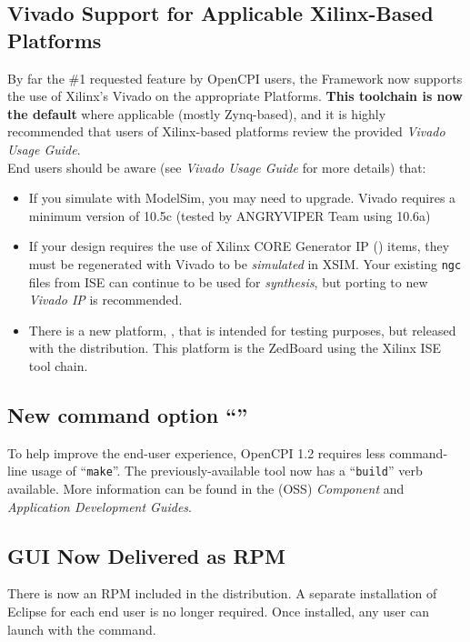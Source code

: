 \subsection{Vivado Support for Applicable Xilinx-Based Platforms} %
\label{sec:12_vivado}
By far the \#1 requested feature by OpenCPI users, the Framework now supports the use of Xilinx's Vivado on the appropriate Platforms. \textbf{This toolchain is now the default} where applicable (mostly Zynq-based), and it is highly recommended that users of Xilinx-based platforms review the provided \textit{Vivado Usage Guide}.\\

End users should be aware (see \textit{Vivado Usage Guide} for more details) that:
\begin{itemize}
\setlength\itemsep{0em} %
\item If you simulate with ModelSim, you may need to upgrade. Vivado requires a minimum version of 10.5c (tested by ANGRYVIPER Team using 10.6a)
\item If your design requires the use of Xilinx CORE Generator IP () items, they must be regenerated with Vivado to be \textit{simulated} in XSIM. Your existing \texttt{ngc} files from ISE can continue to be used for \textit{synthesis}, but porting to new \textit{Vivado IP} is recommended.
\item There is a new platform, , that is intended for testing purposes, but released with the distribution. This platform is the ZedBoard using the Xilinx ISE tool chain.
\end{itemize}

\subsection{New command option ``''} %
To help improve the end-user experience, OpenCPI 1.2 requires less command-line usage of ``\texttt{make}''. The previously-available tool \ocpidev now has a ``\texttt{build}'' verb available. More information can be found in the (OSS) \textit{Component} and \textit{Application Development Guides}.

\subsection{GUI Now Delivered as RPM} %
\label{sec:12_guirpm}
There is now an  RPM included in the distribution. A separate installation of Eclipse for each end user is no longer required. Once installed, any user can launch with the  command.

